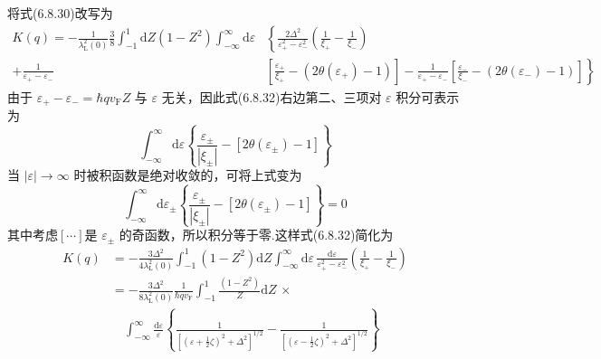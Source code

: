 将式(6.8.30)改写为
\begin{equation}
\begin{aligned}
  K(q)=-\frac{1}{\lambda_{\mathrm{L}}^{2}(0)}\frac{3}{8}
  \int_{-1}^{1}\mathrm{d}Z\left(1-Z^{2}\right)
  \int_{-\infty}^{\infty}\mathrm{d}\varepsilon
  &\left\{\frac{2\Delta^{2}}{\varepsilon_{+}^{2}-\varepsilon_{-}^{2}}
  \left(\frac{1}{\xi_{+}}-\frac{1}{\xi_{-}}\right)\right.\\
  +\frac{1}{\varepsilon_{+}-\varepsilon_{-}}
  &\left[\frac{\varepsilon_{+}}{\xi_{+}}-\left(2\theta(\varepsilon_{+})-1\right)\right]
  -\frac{1}{\varepsilon_{+}-\varepsilon_{-}}
  \left[\frac{\varepsilon_{-}}{\xi_{-}}-\left(2\theta(\varepsilon_{-})-1\right)\right]
  \left.\right\}
\end{aligned}
\end{equation}
由于 $\varepsilon_{+}-\varepsilon_{-}=\hbar qv_{\mathrm{F}}Z$ 与 $\varepsilon$ 无关，因此式(6.8.32)右边第二、三项对 $\varepsilon$ 积分可表示为
\begin{equation*}
  \int_{-\infty}^{\infty}\mathrm{d}\varepsilon
  \left\{\frac{\varepsilon_{\pm}}{|\xi_{\pm}|}
  -\left[2\theta(\varepsilon_{\pm})-1\right]\right\}
\end{equation*}
当 $|\varepsilon|\to\infty$ 时被积函数是绝对收敛的，可将上式变为
\begin{equation*}
  \int_{-\infty}^{\infty}\mathrm{d}\varepsilon_{\pm}
  \left\{\frac{\varepsilon_{\pm}}{|\xi_{\pm}|}
  -\left[2\theta(\varepsilon_{\pm})-1\right]\right\}=0
\end{equation*}
其中考虑$\left[\cdots\right]$是 $\varepsilon_{\pm}$ 的奇函数，所以积分等于零.这样式(6.8.32)简化为
\begin{equation}
\begin{aligned}
  K(q)&=-\frac{3\Delta^{2}}{4\lambda_{\mathrm{L}}^{2}(0)}
  \int_{-1}^{1}\left(1-Z^{2}\right)\mathrm{d}Z
  \int_{-\infty}^{\infty}\mathrm{d}\varepsilon\,
  \frac{\mathrm{d}\varepsilon}{\varepsilon_{+}^{2}-\varepsilon_{-}^{2}}
  \left(\frac{1}{\xi_{+}}-\frac{1}{\xi_{-}}\right)\\
  &=-\frac{3\Delta^{2}}{8\lambda_{\mathrm{L}}^{2}(0)}\frac{1}{\hbar qv_{\mathrm{F}}}
  \int_{-1}^{1}\frac{\left(1-Z^{2}\right)}{Z}\mathrm{d}Z\,\times\\
  &\quad\int_{-\infty}^{\infty}\frac{\mathrm{d}\varepsilon}{\varepsilon}
  \left\{\frac{1}{\left[\left(\varepsilon+\frac{1}{2}\zeta\right)^{2}
  +\Delta^{2}\right]^{1/2}}
  -\frac{1}{\left[\left(\varepsilon-\frac{1}{2}\zeta\right)^{2}
  +\Delta^{2}\right]^{1/2}}\right\}
\end{aligned}
\end{equation}
